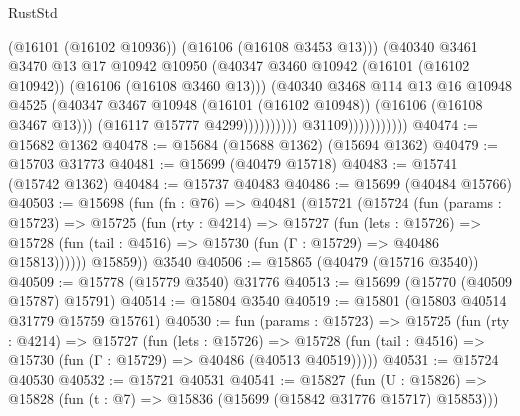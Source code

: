 \begin{lexlean}{RustStd}
\begin{coremodule}
                                          (@16101 (@16102 @10936))
                                          (@16106 (@16108 @3453 @13)))
                                        (@40340
                                          @3461
                                          @3470
                                          @13
                                          @17
                                          @10942
                                          @10950
                                          (@40347
                                            @3460
                                            @10942
                                            (@16101 (@16102 @10942))
                                            (@16106 (@16108 @3460 @13)))
                                          (@40340
                                            @3468
                                            @114
                                            @13
                                            @16
                                            @10948
                                            @4525
                                            (@40347
                                              @3467
                                              @10948
                                              (@16101 (@16102 @10948))
                                              (@16106 (@16108 @3467 @13)))
                                            (@16117 @15777 @4299))))))))))
                          @31109)))))))))))
@40474 := @15682 @1362
@40478 := @15684 (@15688 @1362) (@15694 @1362)
@40479 := @15703 @31773
@40481 := @15699 (@40479 @15718)
@40483 := @15741 (@15742 @1362)
@40484 := @15737 @40483
@40486 := @15699 (@40484 @15766)
@40503 := @15698
    (fun (fn : @76) =>
    @40481
      (@15721
        (@15724
          (fun (params : @15723) =>
          @15725
            (fun (rty : @4214) =>
            @15727
              (fun (lets : @15726) =>
              @15728 (fun (tail : @4516) => @15730 (fun (Γ : @15729) => @40486 @15813))))))
        @15859))
    @3540
@40506 := @15865 (@40479 (@15716 @3540))
@40509 := @15778 (@15779 @3540) @31776
@40513 := @15699 (@15770 (@40509 @15787) @15791)
@40514 := @15804 @3540
@40519 := @15801 (@15803 @40514 @31779 @15759 @15761)
@40530 := fun (params : @15723) =>
  @15725
    (fun (rty : @4214) =>
    @15727
      (fun (lets : @15726) =>
      @15728 (fun (tail : @4516) => @15730 (fun (Γ : @15729) => @40486 (@40513 @40519)))))
@40531 := @15724 @40530
@40532 := @15721 @40531
@40541 := @15827
    (fun (U : @15826) => @15828 (fun (t : @7) => @15836 (@15699 (@15842 @31776 @15717) @15853)))

\end{coremodule}
\end{lexlean}
